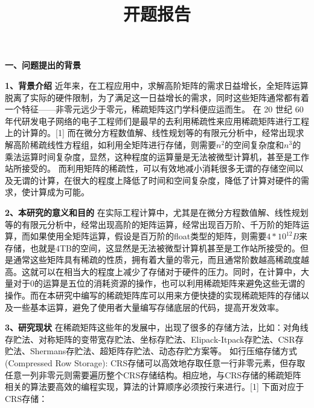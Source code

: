 \documentclass{article}
\begin{document}
  

\title{开题报告}
\date{}

\maketitle


\textbf{一、问题提出的背景}
      \qquad
\newline
    
     \textbf{1、背景介绍}
     \qquad
      近年来，在工程应用中，求解高阶矩阵的需求日益增长，全矩阵运算脱离了实际的硬件限制，为了满足这一日益增长的需求，同时这些矩阵通常都有着一个特征——非零元远少于零元，稀疏矩阵这门学科便应运而生。
在 20 世纪 60 年代研发电子网络的电子工程师们是最早的去利用稀疏性来应用稀疏矩阵进行工程上的计算的。[1]
而在微分方程数值解、线性规划等的有限元分析中，经常出现求解高阶稀疏线性方程组，如利用全矩阵进行存储，则需要$n^2$的空间复杂度和$n^3$的乘法运算时间复杂度，显然，这种程度的运算量是无法被微型计算机，甚至是工作站所接受的。
而利用矩阵的稀疏性，可以有效地减小消耗很多无谓的存储空间以及无谓的计算，在很大的程度上降低了时间和空间复杂度，降低了计算对硬件的需求，使计算成为可能。
\newline

 \textbf{2、本研究的意义和目的}
 \newline
 在实际工程计算中，尤其是在微分方程数值解、线性规划等的有限元分析中，经常出现高阶的矩阵运算，经常出现百万阶、千万阶的矩阵运算，而如果使用全矩阵运算，假设是百万阶的float类型的矩阵，则需要$4*10^{12}B$来存储，也就是4TB的空间，这显然是无法被微型计算机甚至是工作站所接受的。但是通常这些矩阵具有稀疏的性质，拥有着大量的零元，而且通常阶数越高稀疏度越高。这就可以在相当大的程度上减少了存储对于硬件的压力。同时，在计算中，大量对于0的运算是五位的消耗资源的操作，也可以利用稀疏矩阵来避免这些无谓的操作。而在本研究中编写的稀疏矩阵库可以用来方便快捷的实现稀疏矩阵的存储以及一些基本运算，避免了使用者大量编写存储底层的代码，提高开发效率。\newline
 
\textbf{3、研究现状}\newline
在稀疏矩阵这些年的发展中，出现了很多的存储方法，比如：对角线存贮法、对称矩阵的变带宽存贮法、坐标存贮法、Elipack-Itpack存贮法、CSR存贮法、Shermans存贮法、超矩阵存贮法、动态存贮方案等。\newline
如行压缩存储方式(Compressed Row Storage):
CRS存储可以高效地存取任意一行非零元素，但存取任意一列非零元则需要遍历整个CRS存储结构。相应地，与CRS存储的稀疏矩阵相关的算法要高效的编程实现，算法的计算顺序必须按行来进行。[1]
下面对应于CRS存储：
\newline\newline\newline\newline\newline\newline\newline\newline
\end{document}

